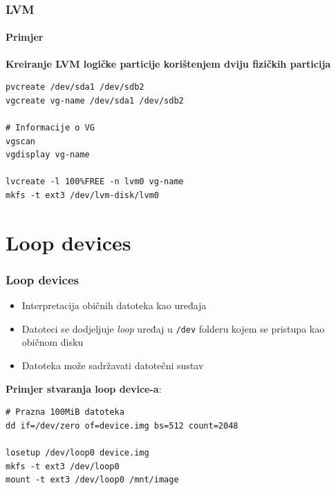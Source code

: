 \documentclass[t]{beamer}
\begin{document}
\begin{frame}[fragile]
	\frametitle{LVM}
	\framesubtitle{Primjer}
	\textbf{Kreiranje LVM logičke particije korištenjem dviju fizičkih particija}\\
	\begin{verbatim}
pvcreate /dev/sda1 /dev/sdb2
vgcreate vg-name /dev/sda1 /dev/sdb2

# Informacije o VG
vgscan
vgdisplay vg-name

lvcreate -l 100%FREE -n lvm0 vg-name
mkfs -t ext3 /dev/lvm-disk/lvm0
	\end{verbatim}
\end{frame}

\section{Loop devices}
\begin{frame}[fragile]
	\frametitle{Loop devices}
	\begin{itemize}
		\item Interpretacija običnih datoteka kao uređaja
		\item Datoteci se dodjeljuje \emph{loop} uređaj u \texttt{/dev} folderu kojem se pristupa kao običnom disku
	\end{itemize}
	\begin{itemize}
		\item Datoteka može sadržavati datotečni sustav
	\end{itemize}
	\vfill
	\textbf{Primjer stvaranja loop device-a}:
	\begin{verbatim}
# Prazna 100MiB datoteka
dd if=/dev/zero of=device.img bs=512 count=2048

losetup /dev/loop0 device.img
mkfs -t ext3 /dev/loop0
mount -t ext3 /dev/loop0 /mnt/image
	\end{verbatim}
\end{frame}
\end{document}
